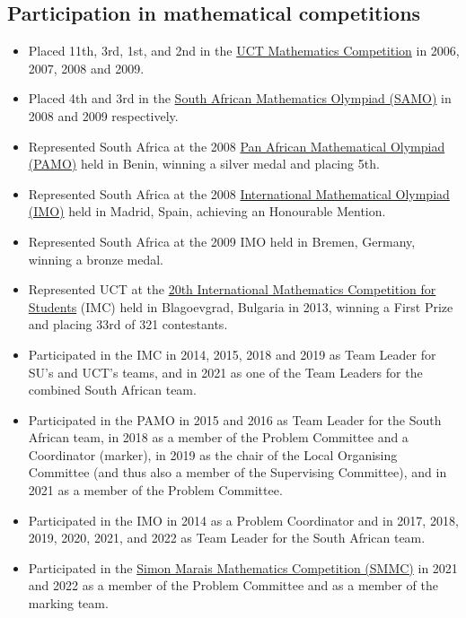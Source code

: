 \documentclass{article}
\begin{document}
\subsection{Participation in mathematical competitions}
\begin{itemize}
	\item Placed 11th, 3rd, 1st, and 2nd in the \href{http://www.mth.uct.ac.za/competition/}{UCT Mathematics Competition} in 2006, 2007, 2008 and 2009.
	\item Placed 4th and 3rd in the \href{http://www.samf.ac.za/sa-mathematics-olympiad}{South African Mathematics Olympiad (SAMO)} in 2008 and 2009 respectively.
	\item Represented South Africa at the 2008 \href{https://www.africamathunion.org/AMU-pamo-official.php}{Pan African Mathematical Olympiad (PAMO)} held in Benin, winning a silver medal and placing 5th.
	\item Represented South Africa at the 2008 \href{http://imo-official.org/}{International Mathematical Olympiad (IMO)} held in Madrid, Spain, achieving an Honourable Mention.
	\item Represented South Africa at the 2009 IMO held in Bremen, Germany, winning a bronze medal.
	\item Represented UCT at the \href{http://www.imc-math.org.uk/index.php?year=2013}{20th International Mathematics Competition for Students} (IMC) held in Blagoevgrad, Bulgaria in 2013, winning a First Prize and placing 33rd of 321 contestants.
	\item Participated in the IMC in 2014, 2015, 2018 and 2019 as Team Leader for SU's and UCT's teams, and in 2021 as one of the Team Leaders for the combined South African team.
	\item Participated in the PAMO in 2015 and 2016 as Team Leader for the South African team, in 2018 as a member of the Problem Committee and a Coordinator (marker), in 2019 as the chair of the Local Organising Committee (and thus also a member of the Supervising Committee), and in 2021 as a member of the Problem Committee.
	\item Participated in the IMO in 2014 as a Problem Coordinator and in 2017, 2018, 2019, 2020, 2021, and 2022 as Team Leader for the South African team.
	\item Participated in the \href{http://www.simonmarais.org/}{Simon Marais Mathematics Competition (SMMC)} in 2021 and 2022 as a member of the Problem Committee and as a member of the marking team.
\end{itemize}
\end{document}
